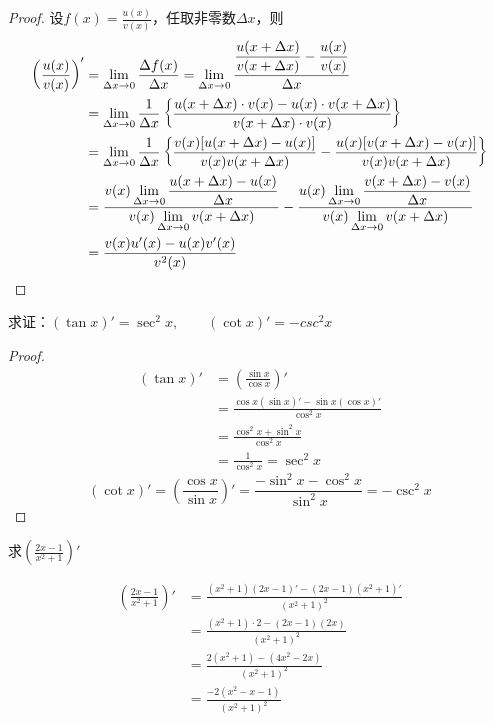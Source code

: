 \begin{proof}
    设$f(x)=\frac{u(x)}{v(x)}$，任取非零数$\Delta x$，则
\[\begin{split}
    \left(\dfrac{u(x)}{v(x)}\right)'&=\lim_{\Delta x\to 0}\dfrac{\Delta f(x)}{\Delta x}=\lim_{\Delta x\to 0}\dfrac{\dfrac{u(x+\Delta x)}{v(x+\Delta x)}-\dfrac{u(x)}{v(x)}}{\Delta x}\\
    &=\lim_{\Delta x\to 0}\dfrac{1}{\Delta x}\left\{\dfrac{u(x+\Delta x)\cdot v(x)-u(x)\cdot v(x+\Delta x)}{v(x+\Delta x)\cdot v(x)}\right\}\\
    &=\lim_{\Delta x\to 0}\dfrac{1}{\Delta x}\left\{\dfrac{v(x)[u(x+\Delta x)-u(x)]}{v(x)v(x+\Delta x)}-\dfrac{u(x)[v(x+\Delta x)-v(x)]}{v(x)v(x+\Delta x)}\right\}\\
    &=\dfrac{v(x)\displaystyle\lim_{\Delta x\to 0}\dfrac{u(x+\Delta x)-u(x)}{\Delta x}}{v(x)\displaystyle\lim_{\Delta x\to 0}v(x+\Delta x)}-\dfrac{u(x)\displaystyle\lim_{\Delta x\to 0}\dfrac{v(x+\Delta x)-v(x)}{\Delta x}}{v(x)\displaystyle\lim_{\Delta x\to 0}v(x+\Delta x)}\\
    &=\dfrac{v(x) u'(x)-u(x) v'(x)}{v^2(x)}
\end{split}\]
\end{proof}


\begin{example}
求证：$(\tan x)'=\sec^2 x,\qquad (\cot x)'=-csc^2 x$
\end{example}

\begin{proof}    
\[\begin{split}
    (\tan x)'&=\left(\frac{\sin x}{\cos x}\right)'\\
    &=\frac{\cos x(\sin x)'-\sin x(\cos x)'}{\cos^2 x}\\
    &=\frac{\cos^2 x+\sin^2 x}{\cos^2x}\\
    &=\frac{1}{\cos^2 x}=\sec^2 x
\end{split}\]
\[(\cot x)'=\left(\frac{\cos x}{\sin x}\right)'=\frac{-\sin^2 x-\cos^2 x}{\sin^2 x}=-\csc^2 x\]    
\end{proof}

\begin{example}
    求$\left(\frac{2x-1}{x^2+1}\right)'$
\end{example}

\begin{solution}
\[\begin{split}
    \left(\frac{2x-1}{x^2+1}\right)'&=\frac{(x^2+1)(2x-1)'-(2x-1)(x^2+1)'}{(x^2+1)^2}\\
&=\frac{(x^2+1)\cdot 2-(2x-1)(2x)}{(x^2+1)^2}\\
&=\frac{2(x^2+1)-(4x^2-2x)}{(x^2+1)^2}\\
&=\frac{-2(x^2-x-1)}{(x^2+1)^2}
\end{split}\]
\end{solution}

